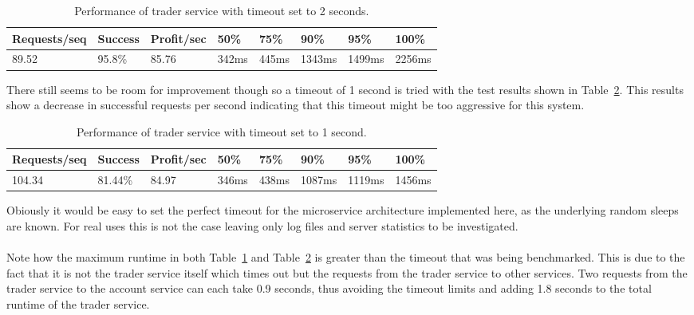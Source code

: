 \begin{table}[]
\centering
\caption{Performance of trader service with timeout set to 2 seconds.}
\label{table:timeouttest2sec}
\begin{tabular}{|l|l|l|l|l|l|l|l|}
\hline
Requests/seq & Success & Profit/sec & 50\% & 75\% & 90\% & 95\% & 100\% \\ \hline
89.52 & 95.8\% & 85.76 & 342ms & 445ms & 1343ms & 1499ms & 2256ms\\ \hline
\end{tabular}
\end{table}
There still seems to be room for improvement though so a timeout of 1
second is tried with the test results shown in
Table~\ref{table:timeouttest1sec}. This results show a decrease in
successful requests per second indicating that this timeout might be
too aggressive for this system.
\begin{table}[]
\centering
\caption{Performance of trader service with timeout set to 1 second.}
\label{table:timeouttest1sec}
\begin{tabular}{|l|l|l|l|l|l|l|l|}
\hline
Requests/seq & Success & Profit/sec & 50\% & 75\% & 90\% & 95\% & 100\% \\ \hline
104.34 & 81.44\% & 84.97 & 346ms & 438ms & 1087ms & 1119ms & 1456ms\\ \hline
\end{tabular}
\end{table}
Obiously it would be easy to set the perfect timeout for the
microservice architecture implemented here, as the underlying random
sleeps are known. For real uses this is not the case leaving only log
files and server statistics to be investigated.
\\\\
Note how the maximum runtime in both Table~\ref{table:timeouttest2sec}
and Table~\ref{table:timeouttest1sec} is greater than the timeout that
was being benchmarked. This is due to the fact that it is not the
trader service itself which times out but the requests from the trader
service to other services. Two requests from the trader service to the
account service can each take 0.9 seconds, thus avoiding the timeout
limits and adding 1.8 seconds to the total runtime of the trader service.

